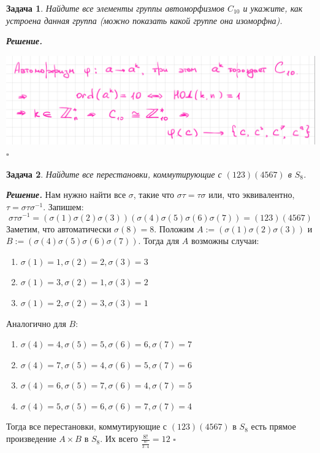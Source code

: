\documentclass[12pt]{article}
\newtheorem{problem}{Задача}
\newenvironment{solution}[1][\it{Реше\textit{}ние}]{\textbf{#1. } }{$\square$}
\begin{document}
\begin{problem}
    Найдите все элементы группы автоморфизмов $C_{10}$ и укажите, как устроена данная группа (можно показать какой группе она изоморфна).
\end{problem}

\begin{solution}


    \includegraphics[width = 16cm]{IMG_FAC29663DB78-1.jpeg}
\end{solution}

\begin{problem}
    Найдите все перестановки, коммутирующие с $(123)(4567)$ в $S_{8}$.
\end{problem}

\begin{solution} Нам нужно найти все $\sigma$, такие что  $\sigma \tau = \tau \sigma$ или, что эквивалентно, $\tau = \sigma \tau \sigma^{-1}$. Запишем:
    $$
    \sigma \tau \sigma^{-1} = (\sigma(1) \sigma(2) \sigma(3)) (\sigma(4) \sigma(5) \sigma(6) \sigma(7)) = (123)(4567)
    $$
Заметим, что автоматически $\sigma(8) = 8$. Положим $A := (\sigma(1) \sigma(2) \sigma(3))$ и $B := (\sigma(4) \sigma(5) \sigma(6) \sigma(7))$. Тогда для $A$ возможны случаи:
    \begin{enumerate}
        \item $\sigma(1) = 1, \sigma(2) = 2, \sigma(3) = 3$
        \item $\sigma(1) = 3, \sigma(2) = 1, \sigma(3) = 2$
        \item $\sigma(1) = 2, \sigma(2) = 3, \sigma(3) = 1$
    \end{enumerate}

Аналогично для $B$:

    \begin{enumerate}
        \item $\sigma(4) = 4, \sigma(5) = 5, \sigma(6) = 6, \sigma(7) = 7$
        \item $\sigma(4) = 7, \sigma(5) = 4, \sigma(6) = 5, \sigma(7) = 6$
        \item $\sigma(4) = 6, \sigma(5) = 7, \sigma(6) = 4, \sigma(7) = 5$
        \item $\sigma(4) = 5, \sigma(5) = 6, \sigma(6) = 7, \sigma(7) = 4$
    \end{enumerate}

    Тогда все перестановки, коммутирующие с $(123)(4567)$ в $S_{8}$ есть прямое произведение $A \times B$ в $S_8$. Их всего $\frac{8!}{\frac{8!}{3 \cdot 4}} = 12$
\end{solution}
\end{document}
